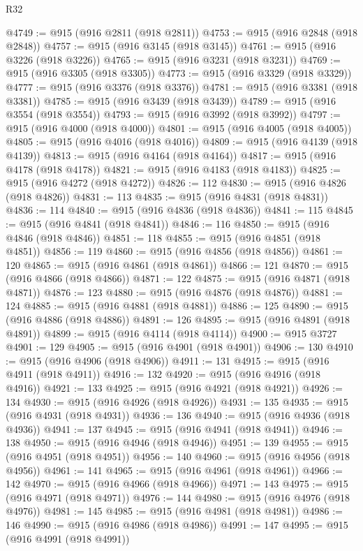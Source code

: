 \begin{lexlean}{R32}
\begin{coremodule}
@4749 := @915 (@916 @2811 (@918 @2811))
@4753 := @915 (@916 @2848 (@918 @2848))
@4757 := @915 (@916 @3145 (@918 @3145))
@4761 := @915 (@916 @3226 (@918 @3226))
@4765 := @915 (@916 @3231 (@918 @3231))
@4769 := @915 (@916 @3305 (@918 @3305))
@4773 := @915 (@916 @3329 (@918 @3329))
@4777 := @915 (@916 @3376 (@918 @3376))
@4781 := @915 (@916 @3381 (@918 @3381))
@4785 := @915 (@916 @3439 (@918 @3439))
@4789 := @915 (@916 @3554 (@918 @3554))
@4793 := @915 (@916 @3992 (@918 @3992))
@4797 := @915 (@916 @4000 (@918 @4000))
@4801 := @915 (@916 @4005 (@918 @4005))
@4805 := @915 (@916 @4016 (@918 @4016))
@4809 := @915 (@916 @4139 (@918 @4139))
@4813 := @915 (@916 @4164 (@918 @4164))
@4817 := @915 (@916 @4178 (@918 @4178))
@4821 := @915 (@916 @4183 (@918 @4183))
@4825 := @915 (@916 @4272 (@918 @4272))
@4826 := 112
@4830 := @915 (@916 @4826 (@918 @4826))
@4831 := 113
@4835 := @915 (@916 @4831 (@918 @4831))
@4836 := 114
@4840 := @915 (@916 @4836 (@918 @4836))
@4841 := 115
@4845 := @915 (@916 @4841 (@918 @4841))
@4846 := 116
@4850 := @915 (@916 @4846 (@918 @4846))
@4851 := 118
@4855 := @915 (@916 @4851 (@918 @4851))
@4856 := 119
@4860 := @915 (@916 @4856 (@918 @4856))
@4861 := 120
@4865 := @915 (@916 @4861 (@918 @4861))
@4866 := 121
@4870 := @915 (@916 @4866 (@918 @4866))
@4871 := 122
@4875 := @915 (@916 @4871 (@918 @4871))
@4876 := 123
@4880 := @915 (@916 @4876 (@918 @4876))
@4881 := 124
@4885 := @915 (@916 @4881 (@918 @4881))
@4886 := 125
@4890 := @915 (@916 @4886 (@918 @4886))
@4891 := 126
@4895 := @915 (@916 @4891 (@918 @4891))
@4899 := @915 (@916 @4114 (@918 @4114))
@4900 := @915 @3727
@4901 := 129
@4905 := @915 (@916 @4901 (@918 @4901))
@4906 := 130
@4910 := @915 (@916 @4906 (@918 @4906))
@4911 := 131
@4915 := @915 (@916 @4911 (@918 @4911))
@4916 := 132
@4920 := @915 (@916 @4916 (@918 @4916))
@4921 := 133
@4925 := @915 (@916 @4921 (@918 @4921))
@4926 := 134
@4930 := @915 (@916 @4926 (@918 @4926))
@4931 := 135
@4935 := @915 (@916 @4931 (@918 @4931))
@4936 := 136
@4940 := @915 (@916 @4936 (@918 @4936))
@4941 := 137
@4945 := @915 (@916 @4941 (@918 @4941))
@4946 := 138
@4950 := @915 (@916 @4946 (@918 @4946))
@4951 := 139
@4955 := @915 (@916 @4951 (@918 @4951))
@4956 := 140
@4960 := @915 (@916 @4956 (@918 @4956))
@4961 := 141
@4965 := @915 (@916 @4961 (@918 @4961))
@4966 := 142
@4970 := @915 (@916 @4966 (@918 @4966))
@4971 := 143
@4975 := @915 (@916 @4971 (@918 @4971))
@4976 := 144
@4980 := @915 (@916 @4976 (@918 @4976))
@4981 := 145
@4985 := @915 (@916 @4981 (@918 @4981))
@4986 := 146
@4990 := @915 (@916 @4986 (@918 @4986))
@4991 := 147
@4995 := @915 (@916 @4991 (@918 @4991))

\end{coremodule}
\end{lexlean}
